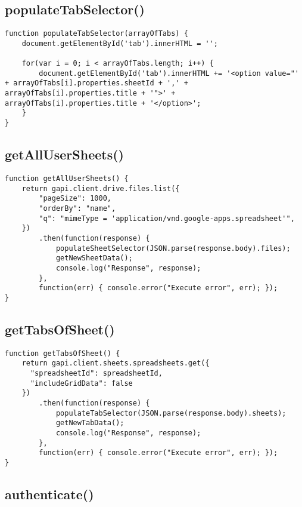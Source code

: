 \documentclass[letterpaper]{article}
\begin{document}
\subsection{populateTabSelector()}

\begin{lstlisting}[firstnumber=48]
function populateTabSelector(arrayOfTabs) {
    document.getElementById('tab').innerHTML = '';

    for(var i = 0; i < arrayOfTabs.length; i++) {
        document.getElementById('tab').innerHTML += '<option value="' + arrayOfTabs[i].properties.sheetId + ',' + arrayOfTabs[i].properties.title + '">' + arrayOfTabs[i].properties.title + '</option>';
    }
}
\end{lstlisting}

\subsection{getAllUserSheets()}

\begin{lstlisting}[firstnumber=56]
function getAllUserSheets() {
    return gapi.client.drive.files.list({
        "pageSize": 1000,
        "orderBy": "name",
        "q": "mimeType = 'application/vnd.google-apps.spreadsheet'",
    })
        .then(function(response) {
            populateSheetSelector(JSON.parse(response.body).files);
            getNewSheetData();
            console.log("Response", response);
        },
        function(err) { console.error("Execute error", err); });
}
\end{lstlisting}

\subsection{getTabsOfSheet()}

\begin{lstlisting}[firstnumber=70]
function getTabsOfSheet() {
    return gapi.client.sheets.spreadsheets.get({
      "spreadsheetId": spreadsheetId,
      "includeGridData": false
    })
        .then(function(response) {
            populateTabSelector(JSON.parse(response.body).sheets);
            getNewTabData();
            console.log("Response", response);
        },
        function(err) { console.error("Execute error", err); });
}
\end{lstlisting}

\subsection{authenticate()}
\end{document}
